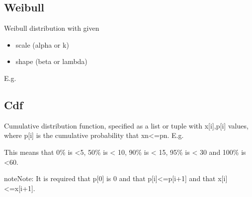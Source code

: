 \documentclass[letterpaper,10pt,english]{sphinxmanual}
\begin{document}
\subsection{Weibull}
\label{\detokenize{Distributions:weibull}}
Weibull distribution with given
\begin{itemize}
\item {} 
scale (alpha or k)

\item {} 
shape (beta or lambda)

\end{itemize}

E.g.

\begin{sphinxVerbatim}[commandchars=\\\{\}]
     
\end{sphinxVerbatim}


\subsection{Cdf}
\label{\detokenize{Distributions:cdf}}
Cumulative distribution function, specified as a list or tuple with x{[}i{]},p{[}i{]} values, where p{[}i{]} is the cumulative probability
that xn\textless{}=pn. E.g.

\begin{sphinxVerbatim}[commandchars=\\\{\}]
           
\end{sphinxVerbatim}

This means that 0\% is \textless{}5, 50\% is \textless{} 10, 90\% is \textless{} 15, 95\% is \textless{} 30 and 100\% is \textless{}60.

\begin{sphinxadmonition}{note}{Note:}
It is required that p{[}0{]} is 0 and that p{[}i{]}\textless{}=p{[}i+1{]} and that x{[}i{]}\textless{}=x{[}i+1{]}.
\end{sphinxadmonition}
\end{document}
